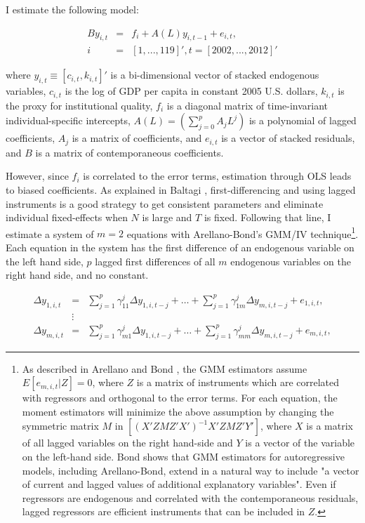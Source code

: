 \documentclass{article}
\begin{document}
I estimate the following model:

\begin{eqnarray}
    B y_{i,t} &=& f_i + A(L)  y_{i,t-1} + e_{i,t}, \\
    i &=& [1, ... , 119]', t = [2002, ... , 2012]' \nonumber
\end{eqnarray}

where $y_{i,t} \equiv [c_{i,t} , k_{i,t}]'$ is a bi-dimensional vector of stacked endogenous variables, $c_{i,t}$ is the log of GDP per capita in constant 2005 U.S. dollars, $k_{i,t}$ is the proxy for institutional quality, $f_i$ is a diagonal matrix of time-invariant individual-specific intercepts, $A(L) = (\sum_{j=0}^p A_{j} L^j)$ is a polynomial of lagged coefficients, $A_{j}$ is a matrix of coefficients, and $e_{i,t}$ is a vector of stacked residuals, and $B$ is a matrix of contemporaneous coefficients.

However, since $f_i$ is correlated to the error terms, estimation through OLS leads to biased coefficients. As explained in Baltagi \parencite*{baltagi}, first-differencing and using lagged instruments is a good strategy to get consistent parameters and eliminate individual fixed-effects when $N$ is large and $T$ is fixed. Following that line, I estimate a system of $m = 2$ equations with Arellano-Bond's GMM/IV technique\footnote{As described in Arellano and Bond \parencite*{ab}, the GMM estimators assume $E[e_{m,i,t}|Z] = 0$, where $Z$ is a matrix of instruments which are correlated with regressors and orthogonal to the error terms. For each equation, the moment estimators will minimize the above assumption by changing the symmetric matrix $M$ in $[(X'ZMZ'X')^{-1}X'ZMZ'Y']$, where $X$ is a matrix of all lagged variables on the right hand-side and $Y$ is a vector of the variable on the left-hand side. Bond \parencite*{bond} shows that GMM estimators for autoregressive models, including Arellano-Bond, extend in a natural way to include "a vector of current and lagged values of additional explanatory variables". Even if regressors are endogenous and correlated with the contemporaneous residuals, lagged regressors are efficient instruments that can be included in $Z$.}.  Each equation in the system has the first difference of an endogenous variable on the left hand side, $p$ lagged first differences of all $m$ endogenous variables on the right hand side, and no constant.

\begin{eqnarray}
    \Delta y_{1,i,t} &=& \sum_{j=1}^p \gamma^j_{11} \Delta y_{1,i,t-j} + \hdots + \sum_{j=1}^p \gamma^j_{1m} \Delta y_{m,i,t-j} + e_{1,i,t}, \nonumber \\ 
    &\vdots& \\
\Delta y_{m,i,t} &=& \sum_{j=1}^p \gamma^j_{m1} \Delta y_{1,i,t-j} + \hdots + \sum_{j=1}^p \gamma^j_{mm} \Delta y_{m,i,t-j} + e_{m,i,t}, \nonumber
\end{eqnarray}
\end{document}
